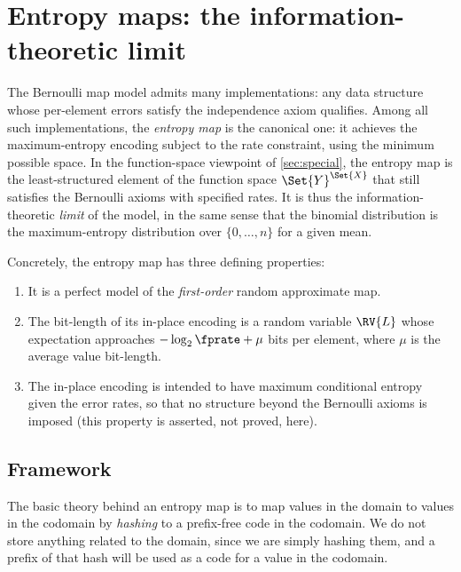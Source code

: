 \documentclass[ ../main.tex]{subfiles}
\begin{document}
\section{Entropy maps: the information-theoretic limit}
\label{sec:entropy-maps}

The Bernoulli map model admits many implementations: any data structure whose per-element errors satisfy the independence axiom qualifies.
Among all such implementations, the \emph{entropy map} is the canonical one: it achieves the maximum-entropy encoding subject to the rate constraint, using the minimum possible space.
In the function-space viewpoint of \cref{sec:special}, the entropy map is the least-structured element of the function space $\Set{Y}^{\Set{X}}$ that still satisfies the Bernoulli axioms with specified rates.
It is thus the information-theoretic \emph{limit} of the model, in the same sense that the binomial distribution is the maximum-entropy distribution over $\{0,\ldots,n\}$ for a given mean.

Concretely, the entropy map has three defining properties:
\begin{enumerate}
\item It is a perfect model of the \emph{first-order} random approximate map.
\item The bit-length of its in-place encoding is a random variable $\RV{L}$ whose expectation approaches $-\log_2 \fprate + \mu$ bits per element, where $\mu$ is the average value bit-length.
\item The in-place encoding is intended to have maximum conditional entropy given the error rates, so that no structure beyond the Bernoulli axioms is imposed (this property is asserted, not proved, here).
\end{enumerate}

\subsection{Framework}
\label{sec:entropy-framework}

The basic theory behind an entropy map is to map values in the domain to
values in the codomain by \emph{hashing} to a prefix-free code in the
codomain. We do not store anything related to the domain, since we are
simply hashing them, and a prefix of that hash will be used as a code
for a value in the codomain.
\end{document}
